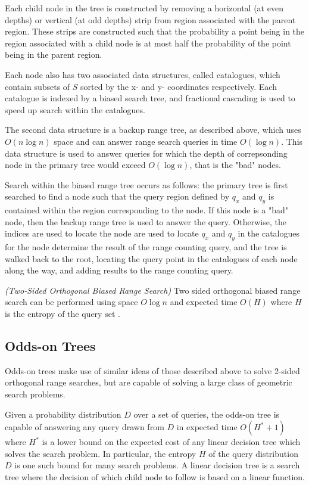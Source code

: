 \documentclass[mcs]{scsthesis}
\begin{document}
Each child node in the tree is constructed by removing a horizontal (at even
depths) or vertical (at odd depths) strip from region associated with the
parent region. These strips are constructed such that the probability a point
being in the region associated with a child node is at most half the probability
of the point being in the parent region.

Each node also has two associated data structures, called catalogues, which
contain subsets of \(S\) sorted by the x- and y- coordinates respectively.
Each catalogue is indexed by a biased search tree, and fractional cascading is
used to speed up search within the catalogues.

The second data structure is a backup range tree, as described above, which
uses \(O(n \log n)\) space and can answer range search queries in time
\(O(\log n)\). This data structure is used to answer queries for which the
depth of correpsonding node in the primary tree would exceed \(O(\log n)\),
that is the "bad" nodes.

Search within the biased range tree occurs as follows: the primary tree is
first searched to find a node such that the query region defined by \(q_x\) and
\(q_y\) is contained within the region corresponding to the node. If this node
is a "bad" node, then the backup range tree is used to answer the query.
Otherwise, the indices are used to locate the node are used to locate \(q_x\)
and \(q_y\) in the catalogues for the node determine the result of the range
counting query, and the tree is walked back to the root, locating the query
point in the catalogues of each node along the way, and adding results to
the range counting query.

\begin{thm} \emph{(Two-Sided Orthogonal Biased Range Search)} 
Two sided orthogonal biased range search can be performed using space
\(O \log n\) and expected time \(O(H)\) where \(H\) is the entropy of the query
set \cite{biasedrange}.
\end{thm}

\subsection{Odds-on Trees}

Odds-on trees make use of similar ideas of those described above to solve
2-sided orthogonal range searches, but are capable of solving a large class
of geometric search problems.

Given a probability distribution \(D\) over a set of queries, the odds-on tree
is capable of answering any query drawn from \(D\) in expected time
\(O(H^* + 1)\) where \(H^*\) is a lower bound on the expected cost of any
linear decision tree which solves the search problem. In particular, the
entropy \(H\) of the query distribution \(D\) is one such bound for many search
problems. A linear decision tree is a search tree where the decision of which
child node to follow is based on a linear function.
\end{document}
